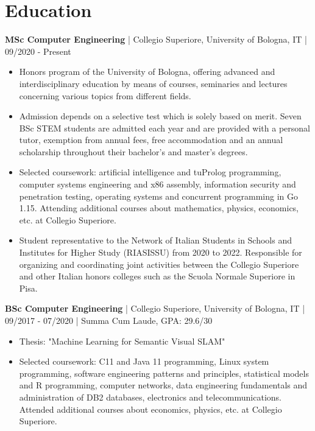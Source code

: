 \documentclass[10pt, a4paper]{article}
\begin{document}
\section*{Education}
\textbf{MSc Computer Engineering} | Collegio Superiore, University of Bologna, IT | 09/2020 - Present
\begin{itemize}
\item Honors program of the University of Bologna, offering advanced and interdisciplinary education by means of courses, seminaries and lectures concerning various topics from different fields. 
\item Admission depends on a selective test which is solely based on merit.
Seven BSc STEM students are admitted each year and are provided with a personal tutor, exemption from annual fees, free accommodation and an annual scholarship throughout their bachelor's and master's degrees.
\item Selected coursework: artificial intelligence and tuProlog programming, computer systems engineering and x86 assembly, information security and penetration testing, operating systems and concurrent programming in Go 1.15. Attending additional courses about mathematics, physics, economics, etc. at Collegio Superiore.
\item Student representative to the Network of Italian Students in Schools and Institutes for Higher Study (RIASISSU) from 2020 to 2022. Responsible for organizing and coordinating joint activities between the Collegio Superiore and other Italian honors colleges such as the Scuola Normale Superiore in Pisa. 
\end{itemize}
\textbf{BSc Computer Engineering} | Collegio Superiore, University of Bologna, IT | 09/2017 - 07/2020 | Summa Cum Laude, GPA: 29.6/30
\begin{itemize}
\item Thesis: "Machine Learning for Semantic Visual SLAM"
\item Selected coursework: C11 and Java 11 programming, Linux system programming, software engineering patterns and principles, statistical models and R programming,
computer networks, data engineering fundamentals and administration of DB2 databases, electronics and telecommunications. Attended additional courses about economics, physics, etc. at Collegio Superiore.
\end{itemize}
\end{document}
